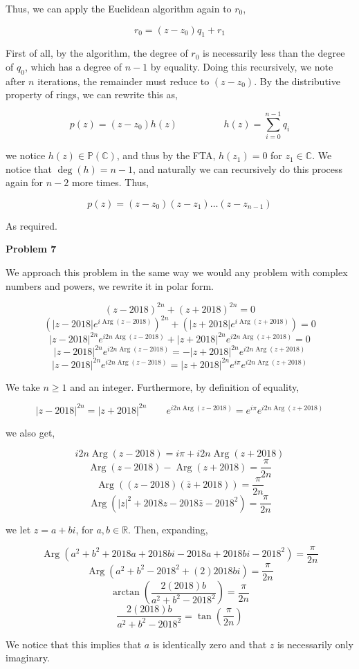 \documentclass[12pt]{article}
\newcommand{\R}{\mathbb{R}}
\newcommand{\C}{\mathbb{C}}
\DeclareMathOperator{\Arg}{Arg}
\begin{document}
Thus, we can apply the Euclidean algorithm again to $r_{0}$,

$$r_{0} = (z - z_{0})q_{1} + r_{1}$$

First of all, by the algorithm, the degree of $r_{0}$ is necessarily less than the degree of $q_{0}$, which has a degree of $n-1$ by equality. Doing this recursively, we note after $n$ iterations, the remainder must reduce to $(z-z_{0})$. By the distributive property of rings, we can rewrite this as,

$$p(z) = (z-z_{0})h(z) \hspace{2cm} h(z) = \sum_{i=0}^{n-1}q_{i}$$

we notice $h(z) \in \mathbb{P}(\C)$, and thus by the FTA, $h(z_{1}) = 0$ for $z_{1} \in \C$. We notice that $\deg(h)=n-1$, and naturally we can recursively do this process again for $n-2$ more times. Thus,

$$p(z) = (z-z_{0})(z-z_{1})\dots (z-z_{n-1})$$

As required.

\newpage

\textbf{Problem 7}

We approach this problem in the same way we would any problem with complex numbers and powers, we rewrite it in polar form.

$$(z-2018)^{2n} + (z+2018)^{2n} = 0$$
$$\left( |z-2018|e^{i\Arg (z-2018)} \right)^{2n} + \left( |z+2018|e^{i\Arg (z+2018)} \right) = 0$$
$$|z-2018|^{2n}e^{i2n\Arg (z-2018)} + |z+2018|^{2n}e^{i2n\Arg (z+2018)} = 0$$
$$|z-2018|^{2n}e^{i2n\Arg (z-2018)} = -|z+2018|^{2n}e^{i2n\Arg (z+2018)}$$
$$|z-2018|^{2n}e^{i2n\Arg (z-2018)} = |z+2018|^{2n}e^{i\pi}e^{i2n\Arg (z+2018)}$$

We take $n \ge 1$ and an integer. Furthermore, by definition of equality,

$$|z-2018|^{2n} = |z+2018|^{2n} \hspace{2em} e^{i2n\Arg (z-2018)} = e^{i\pi}e^{i2n\Arg (z+2018)}$$

we also get,

$$i2n\Arg (z-2018) = i\pi + i2n\Arg (z+2018)$$
$$\Arg (z-2018) - \Arg (z+2018) = \frac{\pi}{2n}$$
$$\Arg \left( (z-2018)(\bar{z}+2018)\right) = \frac{\pi}{2n}$$
$$\Arg (|z|^{2} + 2018z - 2018\bar{z} - 2018^{2}) = \frac{\pi}{2n}$$

we let $z = a+bi$, for $a,b\in \R$. Then, expanding,

$$\Arg (a^{2} + b^{2} + 2018a + 2018bi - 2018a + 2018bi - 2018^{2}) = \frac{\pi}{2n}$$
$$\Arg (a^{2} + b^{2} -2018^{2} + (2)2018bi) = \frac{\pi}{2n}$$
$$\arctan \left( \frac{2(2018)b}{a^{2}+b^{2}-2018^{2}} \right) = \frac{\pi}{2n}$$
$$\frac{2(2018)b}{a^{2}+b^{2}-2018^{2}} = \tan\left(\frac{\pi}{2n}\right)$$

We notice that this implies that $a$ is identically zero and that $z$ is necessarily only imaginary.
\end{document}
